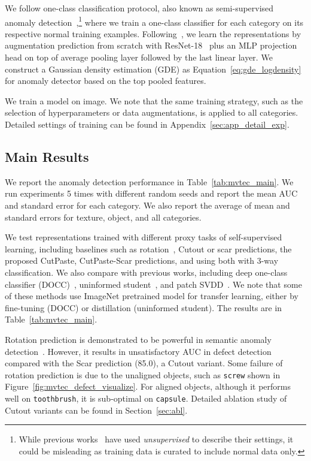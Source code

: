\documentclass[final]{cvpr}
\begin{document}
We follow one-class classification protocol, 
also known as semi-supervised anomaly detection~\cite{chandola2009anomaly},\footnote{While previous works~\cite{bergmann2019mvtec,bergmann2020uninformed} have used \emph{unsupervised} to describe their settings, it could be misleading as training data is curated to include normal data only.}
where we train a one-class classifier for each category on its respective normal training examples. 
Following~\cite{sohn2020learning}, we learn the representations by augmentation prediction from scratch with 
ResNet-18~\cite{he2016deep} plus an MLP projection head on top of average pooling layer followed by the last linear layer. We construct a Gaussian density estimation (GDE) as Equation~\eqref{eq:gde_logdensity} for anomaly detector based on the top pooled features.


We train a model on  image. We note that the same training strategy, such as the selection of hyperparameters or data augmentations, is applied to all categories. Detailed settings of training can be found in Appendix~\ref{sec:app_detail_exp}.




\subsection{Main Results}
\label{sec:exp_main}
We report the anomaly detection performance in Table~\ref{tab:mvtec_main}. We run experiments 5 times with different random seeds and report the mean AUC and standard error for each category. We also report the average of mean and standard errors for texture, object, and all categories.

We test representations trained with different proxy tasks of self-supervised learning, 
including baselines such as rotation~\cite{golan2018deep}, Cutout or scar predictions, the proposed CutPaste, CutPaste-Scar predictions, and using both with 3-way classification. 
We also compare with previous works, including deep one-class classifier (DOCC)~\cite{ruff2020unifying}, uninformed student~\cite{bergmann2019mvtec}, and patch SVDD~\cite{yi2020patch}. We note that some of these methods use ImageNet pretrained model for transfer learning, either by fine-tuning (DOCC) or distillation (uninformed student). 
The results are in Table~\ref{tab:mvtec_main}. 

Rotation prediction is demonstrated to be powerful in semantic anomaly detection~\cite{sohn2020learning}. However, it results in unsatisfactory  AUC in defect detection compared with the Scar prediction (85.0), a Cutout variant.  Some failure of rotation prediction is due to the unaligned objects, such as \texttt{screw} shown in Figure~\ref{fig:mvtec_defect_visualize}. For aligned objects, although it performs well on \texttt{toothbrush}, it is sub-optimal on \texttt{capsule}. 
Detailed ablation study of Cutout variants can be found in Section~\ref{sec:abl}.
\end{document}
